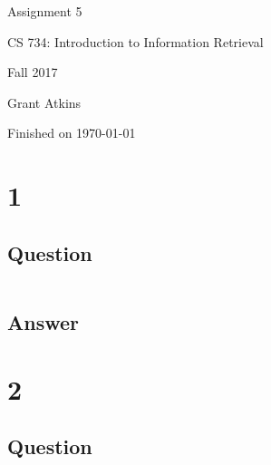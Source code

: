\documentclass[letterpaper,11pt]{article}
\begin{document}
\begin{titlepage}

\begin{center}

\Huge{Assignment 5}

\Large{CS 734:  Introduction to Information Retrieval}

\Large{Fall 2017}

\Large{Grant Atkins}

\Large Finished on \today

\end{center}

\end{titlepage}

\newpage


\section*{1}

\subsection*{Question}

\begin{verbatim}

\end{verbatim}

\subsection*{Answer}




\clearpage


\section*{2}

\subsection*{Question}
\end{document}
